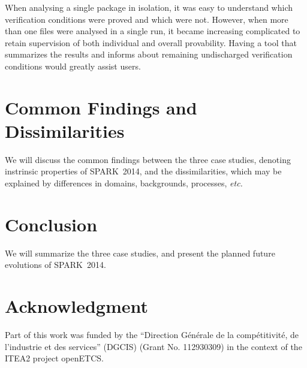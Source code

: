 \documentclass[10pt,a4paper,twocolumn]{article}
\newcommand{\openetcs}{openETCS\xspace}
\newcommand{\newspark}{SPARK~2014\xspace}
\newcommand{\etc}{\textit{etc.}\xspace}
\begin{document}
When analysing a single package in isolation, it was easy to
understand which verification conditions were proved and which were
not. However, when more than one files were analysed in a single run,
it became increasing complicated to retain supervision of both
individual and overall provability. Having a tool that summarizes the
results and informs about remaining undischarged verification
conditions would greatly assist users.

\section{Common Findings and Dissimilarities}

We will discuss the common findings between the three case studies,
denoting instrinsic properties of \newspark, and the dissimilarities,
which may be explained by differences in domains, backgrounds,
processes, \etc

\section{Conclusion}

We will summarize the three case studies, and present the planned future
evolutions of \newspark.

\section{Acknowledgment}

Part of this work was funded by the ``Direction Générale de la
compétitivité, de l'industrie et des services'' (DGCIS) (Grant
No. 112930309) in the context of the ITEA2 project \openetcs.



\end{document}
